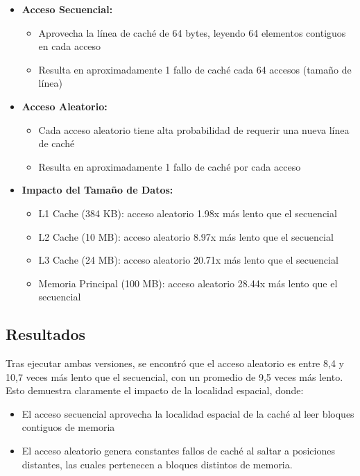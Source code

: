 \documentclass{article}
\begin{document}
\begin{itemize}[noitemsep]
    \item \textbf{Acceso Secuencial:}
    \begin{itemize}[noitemsep]
        \item Aprovecha la línea de caché de 64 bytes, leyendo 64 elementos contiguos en cada acceso
        \item Resulta en aproximadamente 1 fallo de caché cada 64 accesos (tamaño de línea)
    \end{itemize}
    
    \item \textbf{Acceso Aleatorio:}
    \begin{itemize}[noitemsep]
        \item Cada acceso aleatorio tiene alta probabilidad de requerir una nueva línea de caché
        \item Resulta en aproximadamente 1 fallo de caché por cada acceso
    \end{itemize}
    
    \item \textbf{Impacto del Tamaño de Datos:}
    \begin{itemize}[noitemsep]
        \item L1 Cache (384 KB): acceso aleatorio 1.98x más lento que el secuencial
        \item L2 Cache (10 MB): acceso aleatorio 8.97x más lento que el secuencial
        \item L3 Cache (24 MB): acceso aleatorio 20.71x más lento que el secuencial
        \item Memoria Principal (100 MB): acceso aleatorio 28.44x más lento que el secuencial
    \end{itemize}
\end{itemize}

\subsection{Resultados}
Tras ejecutar ambas versiones, se encontró que el acceso aleatorio es entre 8,4 y 10,7 veces más lento que el secuencial, con un promedio de 9,5 veces más lento. Esto demuestra claramente el impacto de la localidad espacial, donde:

\begin{itemize}[noitemsep]
    \item El acceso secuencial aprovecha la localidad espacial de la caché al leer bloques contiguos de memoria
    \item El acceso aleatorio genera constantes fallos de caché al saltar a posiciones distantes, las cuales pertenecen a bloques distintos de memoria.
\end{itemize}
\end{document}
